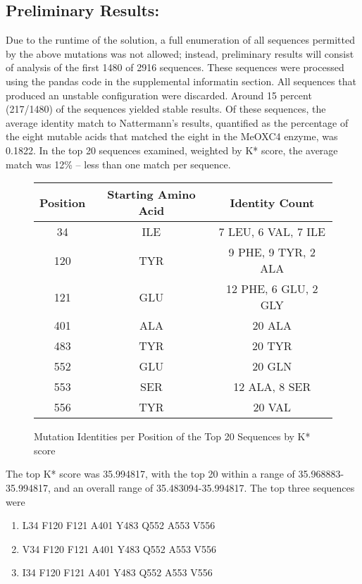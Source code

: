 \documentclass[12pt]{extarticle}
\begin{document}
\subsection{Preliminary Results:}
Due to the runtime of the solution, a full enumeration of all sequences permitted by the above mutations was not allowed; instead, preliminary results will consist of analysis of the first 1480 of 2916 sequences. These sequences were processed using the pandas code in the supplemental informatin section. All sequences that produced an unstable configuration were discarded. Around 15 percent (217/1480) of the sequences yielded stable results. Of these sequences, the average identity match to Nattermann's results, quantified as the percentage of the eight mutable acids that matched the eight in the MeOXC4 enzyme, was 0.1822. In the top 20 sequences examined, weighted by K* score, the average match was 12\% -- less than one match per sequence.\\
\begin{figure}
\begin{center}
\begin{tabular}{||c c c||} 
 \hline
 Position & Starting Amino Acid &  Identity Count \\
 \hline
 34 & ILE & 7 LEU, 6 VAL, 7 ILE\\
 \hline
 120 & TYR & 9 PHE, 9 TYR, 2 ALA \\
 \hline
 121 & GLU & 12 PHE, 6 GLU, 2 GLY  \\
 \hline
 401 & ALA & 20 ALA \\
 \hline
 483 & TYR & 20 TYR \\ 
 \hline
 552 & GLU & 20 GLN \\
 \hline
 553 & SER & 12 ALA, 8 SER \\ 
 \hline
 556 & TYR & 20 VAL\\  
 \hline
 \end{tabular}
\end{center}
\caption{Mutation Identities per Position of the Top 20 Sequences by K* score}
\label{fig:my_label}
\end{figure}
 The top K* score was 35.994817, with the top 20 within a range of 35.968883-35.994817, and an overall range of 35.483094-35.994817. The top three sequences were \begin{enumerate}
     \item L34 F120 F121 A401 Y483 Q552 A553 V556
     \item V34 F120 F121 A401 Y483 Q552 A553 V556
     \item I34 F120 F121 A401 Y483 Q552 A553 V556
 \end{enumerate}
\end{document}
